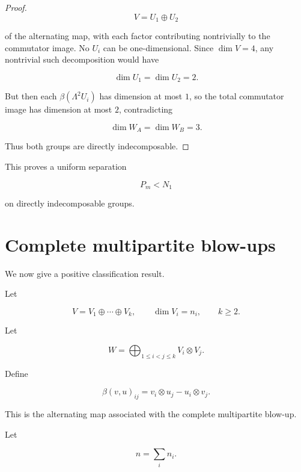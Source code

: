 \documentclass[11pt]{article}
\begin{document}
\begin{proof}
\[
V=U_1\oplus U_2
\]

of the alternating map, with each factor contributing nontrivially to the commutator image. No $U_i$ can be one-dimensional. Since $\dim V=4$, any nontrivial such decomposition would have

\[
\dim U_1=\dim U_2=2.
\]

But then each $\beta(\Lambda^2U_i)$ has dimension at most $1$, so the total commutator image has dimension at most $2$, contradicting

\[
\dim W_A=\dim W_B=3.
\]

Thus both groups are directly indecomposable.
\end{proof}

This proves a uniform separation

\[
P_m<N_1
\]

on directly indecomposable groups.

\section{Complete multipartite blow-ups}

We now give a positive classification result.

Let

\[
V=V_1\oplus\cdots\oplus V_k,
\qquad
\dim V_i=n_i,
\qquad
k\ge2.
\]

Let

\[
W=\bigoplus_{1\le i<j\le k}V_i\otimes V_j.
\]

Define

\[
\beta(v,u)_{ij}
=v_i\otimes u_j-u_i\otimes v_j.
\]

This is the alternating map associated with the complete multipartite blow-up.

Let

\[
n=\sum_i n_i.
\]
\end{document}
